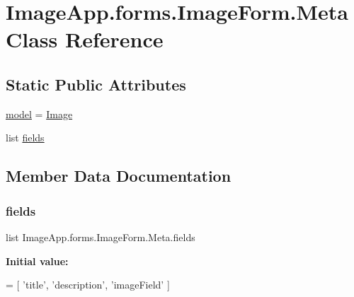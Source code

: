 \hypertarget{class_image_app_1_1forms_1_1_image_form_1_1_meta}{}\section{Image\+App.\+forms.\+Image\+Form.\+Meta Class Reference}
\label{class_image_app_1_1forms_1_1_image_form_1_1_meta}
\subsection*{Static Public Attributes}
\begin{DoxyCompactItemize}
\item 
\mbox{\hyperlink{class_image_app_1_1forms_1_1_image_form_1_1_meta_a6244734a872c87c5026656e8cf3f8011}{model}} = \mbox{\hyperlink{class_image_app_1_1models_1_1_image}{Image}}
\item 
list \mbox{\hyperlink{class_image_app_1_1forms_1_1_image_form_1_1_meta_a25953e0a5d7f49e62c876f6c88a0225e}{fields}}
\end{DoxyCompactItemize}


\subsection{Member Data Documentation}
\mbox{\label{class_image_app_1_1forms_1_1_image_form_1_1_meta_a25953e0a5d7f49e62c876f6c88a0225e}} 
\subsubsection{\texorpdfstring{fields}{fields}}
{\footnotesize\ttfamily list Image\+App.\+forms.\+Image\+Form.\+Meta.\+fields\hspace{0.3cm}{\ttfamily [static]}}

{\bfseries Initial value\+:}
\begin{DoxyCode}
=  [
            \textcolor{stringliteral}{'title'},
            \textcolor{stringliteral}{'description'},
            \textcolor{stringliteral}{'imageField'}
        ]
\end{DoxyCode}
\mbox{\label{class_image_app_1_1forms_1_1_image_form_1_1_meta_a6244734a872c87c5026656e8cf3f8011}} 
